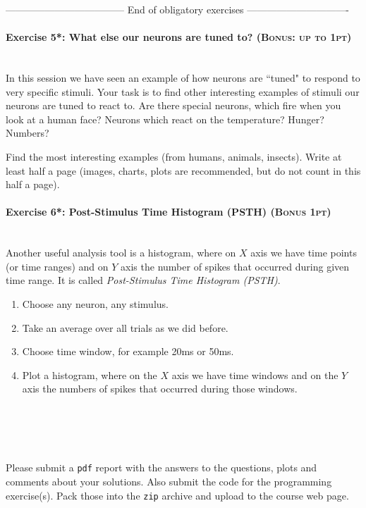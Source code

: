 \documentclass[a4paper,11pt]{article}
\newenvironment{exercise}[3]{\paragraph{Exercise #1: #2 \textsc{(#3pt)}}\ \\}{
\medskip}
\begin{document}
\vspace{1cm}
------------------------------------  End of obligatory exercises  -------------------------------

\vspace{1cm}

\begin{exercise}{5*}{What else our neurons are tuned to?}{Bonus: up to 1}
In this session we have seen an example of how neurons are ``tuned" to respond to very specific stimuli. Your task is to find  other interesting examples of stimuli our neurons are tuned to react to. Are there special neurons, which fire when you look at a human face? Neurons which react on the temperature? Hunger? Numbers?

Find the most interesting examples (from  humans, animals, insects). Write at least half a page (images, charts, plots are recommended, but do not count in this half a page).
\end{exercise}


\begin{exercise}{6*}{Post-Stimulus Time Histogram (PSTH)}{Bonus 1}
Another useful analysis tool is a histogram, where on $X$ axis we have time points (or time ranges) and on $Y$ axis the number of spikes that occurred during given time range. It is called \emph{Post-Stimulus Time Histogram (PSTH)}.
\begin{enumerate}
	\item Choose any neuron, any stimulus.
	\item Take an average over all trials as we did before.
	\item Choose time window, for example 20ms or 50ms.
	\item Plot a histogram, where on the $X$ axis we have time windows and on the $Y$ axis the numbers of spikes that occurred during those windows.
\end{enumerate}
\end{exercise}


\ \\
\ \\
\ \\
\ \\
Please submit a \texttt{pdf} report with the answers to the questions, plots and comments about your solutions. Also submit the code for the programming exercise(s). Pack those into the \texttt{zip} archive and upload to the course web page.
\end{document}
